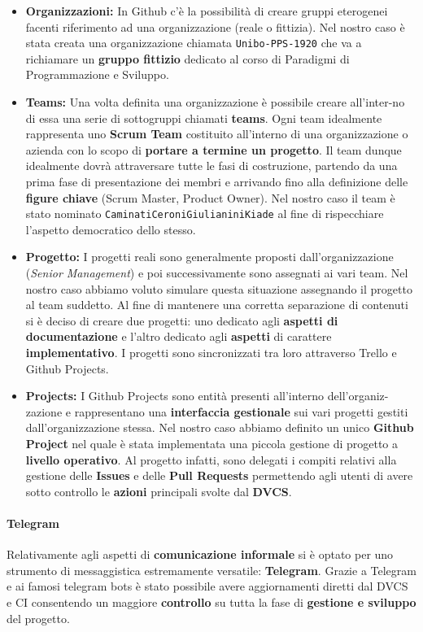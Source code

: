 \begin{itemize}
	\item{\textbf{Organizzazioni:}}
	In Github c'è la possibilità di creare gruppi eterogenei facenti riferimento ad una organizzazione (reale o fittizia). Nel nostro caso è stata creata una organizzazione chiamata \texttt{Unibo-PPS-1920} che va a richiamare un \textbf{gruppo fittizio} dedicato al corso di Paradigmi di Programmazione e Sviluppo.
	\item{\textbf{Teams:}}
	Una volta definita una organizzazione è possibile creare all'inter-no di essa una serie di sottogruppi chiamati \textbf{teams}. Ogni team idealmente rappresenta uno \textbf{Scrum Team} costituito all'interno di una organizzazione o azienda con lo scopo di \textbf{portare a termine un progetto}. Il team dunque idealmente dovrà attraversare tutte le fasi di costruzione, partendo da una prima fase di presentazione dei membri e arrivando fino alla definizione delle \textbf{figure chiave} (Scrum Master, Product Owner). Nel nostro caso il team è stato nominato \texttt{CaminatiCeroniGiulianiniKiade} al fine di rispecchiare l'aspetto democratico dello stesso.
	\item{\textbf{Progetto:}}
	I progetti reali sono generalmente proposti dall'organizzazione (\textit{Senior Management}) e poi successivamente sono assegnati ai vari team. Nel nostro caso abbiamo voluto simulare questa situazione assegnando il progetto al team suddetto. Al fine di mantenere una corretta separazione di contenuti si è deciso di creare due progetti: uno dedicato agli \textbf{aspetti di documentazione} e l'altro dedicato agli \textbf{aspetti} di carattere \textbf{implementativo}. I progetti sono sincronizzati tra loro attraverso Trello e Github Projects.
	\item{\textbf{Projects:}}
	I Github Projects sono entità presenti all'interno dell'organiz-zazione e rappresentano una \textbf{interfaccia gestionale} sui vari progetti gestiti dall'organizzazione stessa. Nel nostro caso abbiamo definito un unico \textbf{Github Project} nel quale è stata implementata una piccola gestione di progetto a \textbf{livello operativo}. Al progetto infatti, sono delegati i compiti relativi alla gestione delle \textbf{Issues} e delle \textbf{Pull Requests} permettendo agli utenti di avere sotto controllo le \textbf{azioni} principali svolte dal \textbf{DVCS}.
\end{itemize}

\paragraph{Telegram}
Relativamente agli aspetti di \textbf{comunicazione informale} si è optato per uno strumento di messaggistica estremamente versatile:  \textbf{Telegram}. Grazie a Telegram e ai famosi telegram bots è stato possibile avere aggiornamenti diretti dal DVCS e CI consentendo un maggiore \textbf{controllo} su tutta la fase di \textbf{gestione e sviluppo} del progetto.

